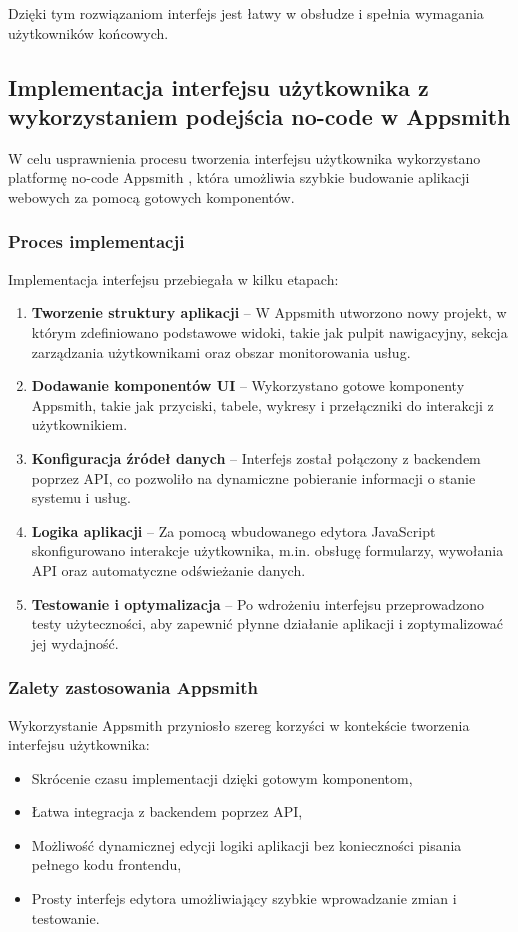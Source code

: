 Dzięki tym rozwiązaniom interfejs jest łatwy w obsłudze i spełnia wymagania użytkowników końcowych.


\subsection{Implementacja interfejsu użytkownika z wykorzystaniem podejścia no-code w Appsmith}

W celu usprawnienia procesu tworzenia interfejsu użytkownika wykorzystano platformę no-code Appsmith \cite{AppSmith}, która umożliwia szybkie budowanie aplikacji webowych za pomocą gotowych komponentów. 

\subsubsection{Proces implementacji}
Implementacja interfejsu przebiegała w kilku etapach:
\begin{enumerate}
    \item \textbf{Tworzenie struktury aplikacji} – W Appsmith utworzono nowy projekt, w którym zdefiniowano podstawowe widoki, takie jak pulpit nawigacyjny, sekcja zarządzania użytkownikami oraz obszar monitorowania usług.
    \item \textbf{Dodawanie komponentów UI} – Wykorzystano gotowe komponenty Appsmith, takie jak przyciski, tabele, wykresy i przełączniki do interakcji z użytkownikiem.
    \item \textbf{Konfiguracja źródeł danych} – Interfejs został połączony z backendem poprzez API, co pozwoliło na dynamiczne pobieranie informacji o stanie systemu i usług.
    \item \textbf{Logika aplikacji} – Za pomocą wbudowanego edytora JavaScript skonfigurowano interakcje użytkownika, m.in. obsługę formularzy, wywołania API oraz automatyczne odświeżanie danych.
    \item \textbf{Testowanie i optymalizacja} – Po wdrożeniu interfejsu przeprowadzono testy użyteczności, aby zapewnić płynne działanie aplikacji i zoptymalizować jej wydajność.
\end{enumerate}

\subsubsection{Zalety zastosowania Appsmith}
Wykorzystanie Appsmith przyniosło szereg korzyści w kontekście tworzenia interfejsu użytkownika:
\begin{itemize}
    \item Skrócenie czasu implementacji dzięki gotowym komponentom,
    \item Łatwa integracja z backendem poprzez API,
    \item Możliwość dynamicznej edycji logiki aplikacji bez konieczności pisania pełnego kodu frontendu,
    \item Prosty interfejs edytora umożliwiający szybkie wprowadzanie zmian i testowanie.
\end{itemize}

